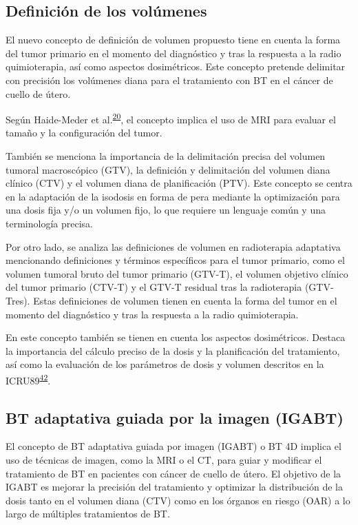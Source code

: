 \documentclass[
  a4paper,
]{scrreprt}
\begin{document}
\hypertarget{definiciuxf3n-de-los-voluxfamenes}{%
\subsection{Definición de los
volúmenes}\label{definiciuxf3n-de-los-voluxfamenes}}

El nuevo concepto de definición de volumen propuesto tiene en cuenta la
forma del tumor primario en el momento del diagnóstico y tras la
respuesta a la radio quimioterapia, así como aspectos dosimétricos. Este
concepto pretende delimitar con precisión los volúmenes diana para el
tratamiento con BT en el cáncer de cuello de útero.

Según Haide-Meder et
al.\textsuperscript{\protect\hyperlink{ref-haie-meder2005}{20}}, el
concepto implica el uso de MRI para evaluar el tamaño y la configuración
del tumor.

También se menciona la importancia de la delimitación precisa del
volumen tumoral macroscópico (GTV), la definición y delimitación del
volumen diana clínico (CTV) y el volumen diana de planificación (PTV).
Este concepto se centra en la adaptación de la isodosis en forma de pera
mediante la optimización para una dosis fija y/o un volumen fijo, lo que
requiere un lenguaje común y una terminología precisa.

Por otro lado, se analiza las definiciones de volumen en radioterapia
adaptativa mencionando definiciones y términos específicos para el tumor
primario, como el volumen tumoral bruto del tumor primario (GTV-T), el
volumen objetivo clínico del tumor primario (CTV-T) y el GTV-T residual
tras la radioterapia (GTV-Tres). Estas definiciones de volumen tienen en
cuenta la forma del tumor en el momento del diagnóstico y tras la
respuesta a la radio quimioterapia.

En este concepto también se tienen en cuenta los aspectos dosimétricos.
Destaca la importancia del cálculo preciso de la dosis y la
planificación del tratamiento, así como la evaluación de los parámetros
de dosis y volumen descritos en la
ICRU89\textsuperscript{\protect\hyperlink{ref-ICRU89}{42}}.

\hypertarget{bt-adaptativa-guiada-por-la-imagen-igabt}{%
\subsection{BT adaptativa guiada por la imagen
(IGABT)}\label{bt-adaptativa-guiada-por-la-imagen-igabt}}

El concepto de BT adaptativa guiada por imagen (IGABT) o BT 4D implica
el uso de técnicas de imagen, como la MRI o el CT, para guiar y
modificar el tratamiento de BT en pacientes con cáncer de cuello de
útero. El objetivo de la IGABT es mejorar la precisión del tratamiento y
optimizar la distribución de la dosis tanto en el volumen diana (CTV)
como en los órganos en riesgo (OAR) a lo largo de múltiples tratamientos
de BT.
\end{document}
